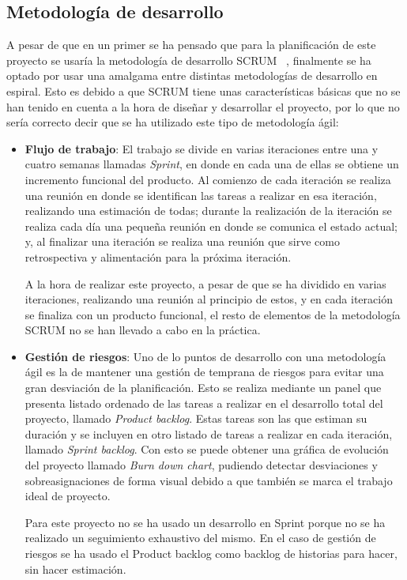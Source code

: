 \subsection{Metodología de desarrollo}
\label{subsec:metodologia}

A pesar de que en un primer se ha pensado que para la planificación de este proyecto se usaría la metodología de desarrollo SCRUM~\cite{Schwaber:2001:ASD:559553} \cite{Schwaber:2004:APM:984028}, finalmente se ha optado por usar una amalgama entre distintas metodologías de desarrollo en espiral. Esto es debido a que SCRUM tiene unas características básicas que no se han tenido en cuenta a la hora de diseñar y desarrollar el proyecto, por lo que no sería correcto decir que se ha utilizado este tipo de metodología ágil:

\begin{itemize}
	\item \textbf{Flujo de trabajo}: El trabajo se divide en varias iteraciones entre una y cuatro semanas llamadas \textit{Sprint}, en donde en cada una de ellas se obtiene un incremento funcional del producto. Al comienzo de cada iteración se realiza una reunión en donde se identifican las tareas a realizar en esa iteración, realizando una estimación de todas; durante la realización de la iteración se realiza cada día una pequeña reunión en donde se comunica el estado actual; y, al finalizar una iteración se realiza una reunión que sirve como retrospectiva y alimentación para la próxima iteración.
	
	A la hora de realizar este proyecto, a pesar de que se ha dividido en varias iteraciones, realizando una reunión al principio de estos, y en cada iteración se finaliza con un producto funcional, el resto de elementos de la metodología SCRUM no se han llevado a cabo en la práctica.
	
	\item \textbf{Gestión de riesgos}: Uno de lo puntos de desarrollo con una metodología ágil es la de mantener una gestión de temprana de riesgos para evitar una gran desviación de la planificación. Esto se realiza mediante un panel que presenta listado ordenado de las tareas a realizar en el desarrollo total del proyecto, llamado \textit{Product backlog}. Estas tareas son las que estiman su duración y se incluyen en otro listado de tareas a realizar en cada iteración, llamado \textit{Sprint backlog}. Con esto se puede obtener una gráfica de evolución del proyecto llamado \textit{Burn down chart}, pudiendo detectar desviaciones y sobreasignaciones de forma visual debido a que también se marca el trabajo ideal de proyecto.
	
	Para este proyecto no se ha usado un desarrollo en Sprint porque no se ha realizado un seguimiento exhaustivo del mismo. En el caso de gestión de riesgos se ha usado el Product backlog como backlog de historias para hacer, sin hacer estimación.
\end{itemize}

